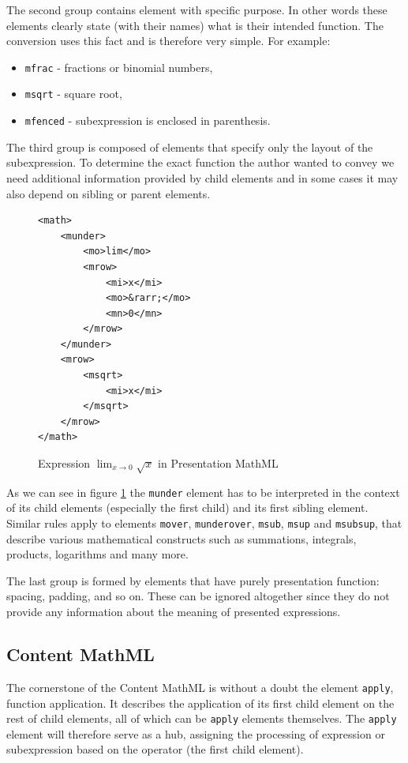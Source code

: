 \documentclass[11pt,oneside,final]{fithesis2}
\begin{document}
The second group contains element with specific purpose. In other words these elements clearly state (with their names) what is their intended function. The conversion uses this fact and is therefore very simple. For example:
\begin{itemize}
\item \texttt{mfrac} - fractions or binomial numbers,
\item \texttt{msqrt} - square root,
\item \texttt{mfenced} - subexpression is enclosed in parenthesis.
\end{itemize}

The third group is composed of elements that specify only the layout of the subexpression. To determine the exact function the author wanted to convey we need additional information provided by child elements and in some cases it may also depend on sibling or parent elements. 
\begin{figure}[!ht]
\lstset{language=XML,frame=lines}
\begin{lstlisting}
<math>
	<munder>
		<mo>lim</mo>
		<mrow>
			<mi>x</mi>
			<mo>&rarr;</mo>
			<mn>0</mn>
		</mrow>		
	</munder>
	<mrow>
		<msqrt>
			<mi>x</mi>
		</msqrt>
	</mrow>
</math>
\end{lstlisting}
\caption{Expression $\lim_{x \to 0}\sqrt{x}$ in Presentation MathML}
\label{fig:mathmllimit}
\end{figure}

As we can see in figure \ref{fig:mathmllimit} the \texttt{munder} element has to be interpreted in the context of its child elements (especially the first child) and its first sibling element. Similar rules apply to elements \texttt{mover}, \texttt{munderover}, \texttt{msub}, \texttt{msup} and \texttt{msubsup}, that describe various mathematical constructs such as summations, integrals, products, logarithms and many more.

The last group is formed by elements that have purely presentation function: spacing, padding, and so on. These can be ignored altogether since they do not provide any information about the meaning of presented expressions.


\subsection{Content MathML}
\label{section:analysis-content}
The cornerstone of the Content MathML is without a doubt the element \texttt{apply}, function application. It describes the application of its first child element on the rest of child elements, all of which can be \texttt{apply} elements themselves. The \texttt{apply} element will therefore serve as a hub, assigning the processing of expression or subexpression based on the operator (the first child element).
\end{document}
